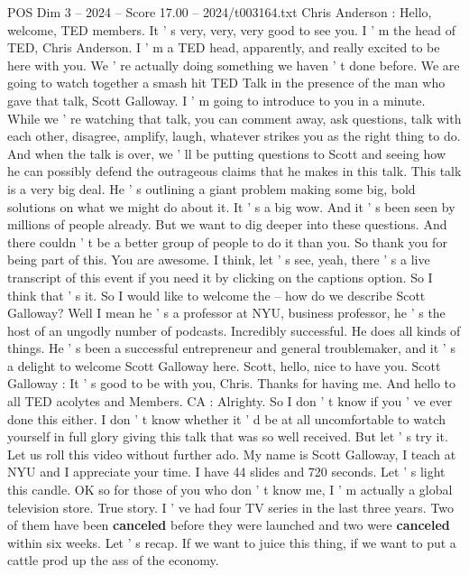 \begin{textsample}{POS Dim 3 – 2024 – Score 17.00 – 2024/t003164.txt}  \label{ex:f3_pos_024}
Chris Anderson : Hello, welcome, TED members.
It ' s very, very, very good to see you.
I ' m the head of TED, Chris Anderson.
I ' m a TED head, apparently, and really excited to be here with you.
We ' re actually doing something we haven ' t done before.
We are going to watch together a smash hit TED Talk in the presence of the man who gave that talk, Scott Galloway.
I ' m going to introduce to you in a minute.
While we ' re watching that talk, you can comment away, ask questions, talk with each other, disagree, amplify, laugh, whatever strikes you as the right thing to do.
And when the talk is over, we ' ll be putting questions to Scott and seeing how he can possibly defend the outrageous claims that he makes in this talk.
This talk is a very big deal.
He ' s outlining a giant problem making some big, bold solutions on what we might do about it.
It ' s a big wow.
And it ' s been seen by millions of people already.
But we want to dig deeper into these questions.
And there couldn ' t be a better group of people to do it than you.
So thank you for being part of this.
You are awesome.
I think, let ' s see, yeah, there ' s a live transcript of this event if you need it by clicking on the captions option.
So I think that ' s it.
So I would like to welcome the -- how do we describe Scott Galloway?
Well I mean he ' s a professor at NYU, business professor, he ' s the host of an ungodly number of podcasts.
Incredibly successful.
He does all kinds of things.
He ' s been a successful entrepreneur and general troublemaker, and it ' s a delight to welcome Scott Galloway here.
Scott, hello, nice to have you.
Scott Galloway : It ' s good to be with you, Chris.
Thanks for having me.
And hello to all TED acolytes and Members.
CA : Alrighty.
So I don ' t know if you ' ve ever done this either.
I don ' t know whether it ' d be at all uncomfortable to watch yourself in full glory giving this talk that was so well received.
But let ' s try it.
Let us roll this video without further ado.
My name is Scott Galloway, I teach at NYU and I appreciate your time.
I have 44 slides and 720 seconds.
Let ' s light this candle.
OK so for those of you who don ' t know me, I ' m actually a global television store.
True story.
I ' ve had four TV series in the last three years.
Two of them have been \textbf{canceled} before they were launched and two were \textbf{canceled} within six weeks.
Let ' s recap.
If we want to juice this thing, if we want to put a cattle prod up the ass of the economy.

\end{textsample}
